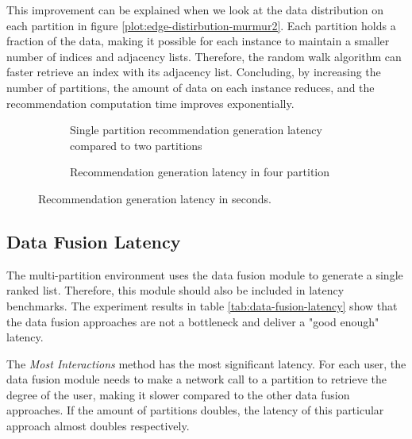 This improvement can be explained when we look at the data distribution on each partition in figure \ref{plot:edge-distirbution-murmur2}. Each partition holds a fraction of the data, making it possible for each instance to maintain a smaller number of indices and adjacency lists. Therefore, the random walk algorithm can faster retrieve an index with its adjacency list. Concluding, by increasing the number of partitions, the amount of data on each instance reduces, and the recommendation computation time improves exponentially.

\begin{figure}[!ht]
    \centering
    \begin{subfigure}{\textwidth}
        \centering
        
        \caption{Single partition recommendation generation latency compared to two partitions}
        \label{plot:recommendation-latency-two-partitions}
    \end{subfigure}\qquad

    \begin{subfigure}{\textwidth}
        \centering
        
        \caption{Recommendation generation latency in four partition}
        \label{plot:recommendation-latency-four-partitions}
    \end{subfigure}\qquad
    \caption{Recommendation generation latency in seconds.}
    \label{plot:recommendation-latency}
\end{figure}



\subsection{Data Fusion Latency}
\label{subsec:data-fusion-latency}
The multi-partition environment uses the data fusion module to generate a single ranked list. Therefore, this module should also be included in latency benchmarks. The experiment results in table \ref{tab:data-fusion-latency} show that the data fusion approaches are not a bottleneck and deliver a "good enough" latency.


The \emph{Most Interactions} method has the most significant latency. For each user, the data fusion module needs to make a network call to a partition to retrieve the degree of the user, making it slower compared to the other data fusion approaches. If the amount of partitions doubles, the latency of this particular approach almost doubles respectively.


